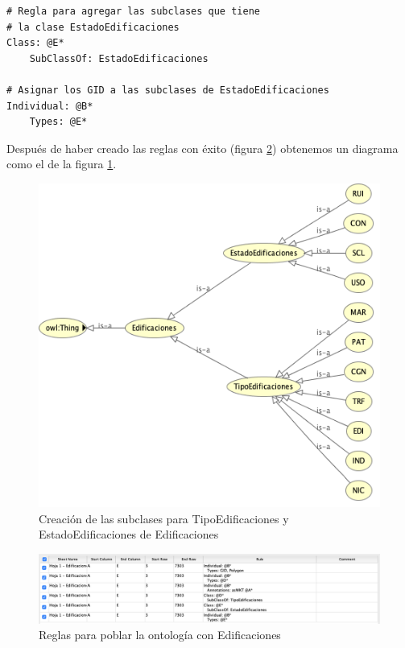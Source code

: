 

\begin{lstlisting}
# Regla para agregar las subclases que tiene 
# la clase EstadoEdificaciones 
Class: @E*
	SubClassOf: EstadoEdificaciones

# Asignar los GID a las subclases de EstadoEdificaciones
Individual: @B*
	Types: @E*
\end{lstlisting}


\vspace*{0.2cm}
Después de haber creado las reglas con éxito (figura \ref{fig:reglas-edificaciones}) obtenemos un diagrama como el de la figura \ref{fig:edificaciones-copia}.

\begin{figure}[H]
	\centering
	\includegraphics[width=0.65\linewidth]{imagenes/capitulo5/Edificaciones-copia}
	\caption{Creación de las subclases para TipoEdificaciones y EstadoEdificaciones de Edificaciones}
	\label{fig:edificaciones-copia}
\end{figure}





\begin{figure}[H]
	\centering
	\includegraphics[width=1\linewidth]{imagenes/capitulo5/reglas-edificaciones}
	\caption{Reglas para poblar la ontología con Edificaciones}
	\label{fig:reglas-edificaciones}
\end{figure}

